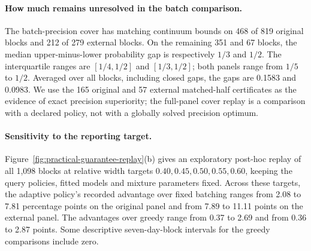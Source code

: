 \paragraph{How much remains unresolved in the batch comparison.}
The batch-precision cover has matching continuum bounds on 468 of 819 original
blocks and 212 of 279 external blocks. On the remaining 351 and 67 blocks,
the median upper-minus-lower probability gap is respectively $1/3$ and $1/2$.
The interquartile ranges are $[1/4,1/2]$ and $[1/3,1/2]$; both panels range
from $1/5$ to $1/2$. Averaged over all blocks, including closed gaps, the gaps
are 0.1583 and 0.0983. We use the 165 original and 57 external matched-half certificates as the evidence
of exact precision superiority; the full-panel cover replay is a comparison
with a declared policy, not with a globally solved precision optimum.

\paragraph{Sensitivity to the reporting target.}
Figure~\ref{fig:practical-guarantee-replay}(b) gives an exploratory post-hoc
replay of all 1,098 blocks at relative width targets
$0.40,0.45,0.50,0.55,0.60$, keeping the query policies, fitted models and
mixture parameters fixed.
Across these targets, the adaptive policy's recorded advantage over fixed
batching ranges from 2.08 to 7.81 percentage points on the original panel and
from 7.89 to 11.11 points on the external panel. The advantages over greedy
range from 0.37 to 2.69 and from 0.36 to 2.87 points. Some descriptive
seven-day-block intervals for the greedy comparisons include zero.
